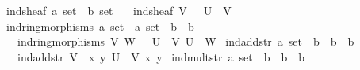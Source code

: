 \documentclass[12pt]{scrartcl}
\begin{document}
\begin{isabelle}
\isamarkupfalse%
\ ind{\isacharunderscore}{\kern0pt}sheaf{\isacharcolon}{\kern0pt}{\isacharcolon}{\kern0pt}\ {\isachardoublequoteopen}{\isacharprime}{\kern0pt}a\ set\ {\isasymRightarrow}\ {\isacharprime}{\kern0pt}b\ set{\isachardoublequoteclose}\isanewline
\ \ \ {\isachardoublequoteopen}ind{\isacharunderscore}{\kern0pt}sheaf\ V\ {\isasymequiv}\ {\isasymFF}\ {\isacharparenleft}{\kern0pt}U\ {\isasyminter}\ V{\isacharparenright}{\kern0pt}{\isachardoublequoteclose}\isanewline
\isanewline
{}\isamarkupfalse%
\ ind{\isacharunderscore}{\kern0pt}ring{\isacharunderscore}{\kern0pt}morphisms{\isacharcolon}{\kern0pt}{\isacharcolon}{\kern0pt}\ {\isachardoublequoteopen}{\isacharprime}{\kern0pt}a\ set\ {\isasymRightarrow}\ {\isacharprime}{\kern0pt}a\ set\ {\isasymRightarrow}\ {\isacharparenleft}{\kern0pt}{\isacharprime}{\kern0pt}b\ {\isasymRightarrow}\ {\isacharprime}{\kern0pt}b{\isacharparenright}{\kern0pt}{\isachardoublequoteclose}\isanewline
\ \ \ {\isachardoublequoteopen}ind{\isacharunderscore}{\kern0pt}ring{\isacharunderscore}{\kern0pt}morphisms\ V\ W\ {\isasymequiv}\ {\isasymrho}\ {\isacharparenleft}{\kern0pt}U\ {\isasyminter}\ V{\isacharparenright}{\kern0pt}\ {\isacharparenleft}{\kern0pt}U\ {\isasyminter}\ W{\isacharparenright}{\kern0pt}{\isachardoublequoteclose}\isanewline
\isanewline
{}\isamarkupfalse%
\ ind{\isacharunderscore}{\kern0pt}add{\isacharunderscore}{\kern0pt}str{\isacharcolon}{\kern0pt}{\isacharcolon}{\kern0pt}\ {\isachardoublequoteopen}{\isacharprime}{\kern0pt}a\ set\ {\isasymRightarrow}\ {\isacharparenleft}{\kern0pt}{\isacharprime}{\kern0pt}b\ {\isasymRightarrow}\ {\isacharprime}{\kern0pt}b\ {\isasymRightarrow}\ {\isacharprime}{\kern0pt}b{\isacharparenright}{\kern0pt}{\isachardoublequoteclose}\isanewline
\ \ \ {\isachardoublequoteopen}ind{\isacharunderscore}{\kern0pt}add{\isacharunderscore}{\kern0pt}str\ V\ {\isasymequiv}\ {\isasymlambda}x\ y{\isachardot}{\kern0pt}\ {\isacharplus}{\kern0pt}\isactrlbsub {\isacharparenleft}{\kern0pt}U\ {\isasyminter}\ V{\isacharparenright}{\kern0pt}\isactrlesub \ x\ y{\isachardoublequoteclose}\isanewline
\isanewline
{}\isamarkupfalse%
\ ind{\isacharunderscore}{\kern0pt}mult{\isacharunderscore}{\kern0pt}str{\isacharcolon}{\kern0pt}{\isacharcolon}{\kern0pt}\ {\isachardoublequoteopen}{\isacharprime}{\kern0pt}a\ set\ {\isasymRightarrow}\ {\isacharparenleft}{\kern0pt}{\isacharprime}{\kern0pt}b\ {\isasymRightarrow}\ {\isacharprime}{\kern0pt}b\ {\isasymRightarrow}\ {\isacharprime}{\kern0pt}b{\isacharparenright}{\kern0pt}{\isachardoublequoteclose}\isanewline

\end{isabelle}
\end{document}
